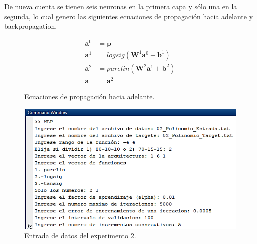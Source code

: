 De nueva cuenta se tienen seis neuronas en la primera capa y sólo una en la segunda, lo cual genero las siguientes ecuaciones de propagación hacia adelante y backpropagation.

\begin{figure}[H]
    \begin{align*}
    \boldsymbol{a}^0 &= \boldsymbol{p} \\
    \boldsymbol{a}^{1} &= logsig(\boldsymbol{W}^{1}\boldsymbol{a}^{0}+\boldsymbol{b}^{1}
    ) \\
    \boldsymbol{a}^{2} &= purelin(\boldsymbol{W}^{2}\boldsymbol{a}^{1}+\boldsymbol{b}^{2}
    ) \\
    \boldsymbol{a} &= \boldsymbol{a}^{2}
    \end{align*}
    \caption{Ecuaciones de propagación hacia adelante.}
\end{figure}

\begin{figure}[H]
    \begin{center}
        \includegraphics[width=14cm]{2/entrada.png}
        \caption{Entrada de datos del experimento 2.}
        \label{fig:entrada2}
    \end{center}
\end{figure}

